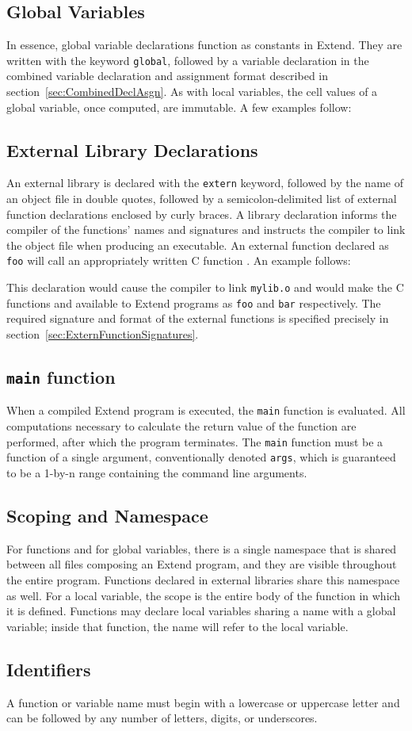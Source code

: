 	\subsection{Global Variables}
		In essence, global variable declarations function as constants in Extend. They are written with the keyword \texttt{global}, followed by a variable declaration in the combined variable declaration and assignment format described in section~\ref{sec:CombinedDeclAsgn}. As with local variables, the cell values of a global variable, once computed, are immutable. A few examples follow:
		
	\subsection{External Library Declarations}
	  An external library is declared with the \texttt{extern} keyword, followed by the name of an object file in double quotes, followed by a semicolon-delimited list of external function declarations enclosed by curly braces. A library declaration informs the compiler of the functions' names and signatures and instructs the compiler to link the
		object file when producing an executable. An external function declared as \texttt{foo} will call an appropriately written C function \texttt{}. An example follows:
		
		This declaration would cause the compiler to link \texttt{mylib.o} and would make the C functions \texttt{} and \texttt{} available to Extend programs as \texttt{foo} and \texttt{bar} respectively. The required signature and format of the external functions is specified precisely in section~\ref{sec:ExternFunctionSignatures}.
		\subsection{\texttt{main} function}
		When a compiled Extend program is executed, the \texttt{main} function is evaluated. All computations necessary to calculate the return value of the function are performed, after which the program terminates. The \texttt{main} function must be a function of a single argument, conventionally denoted \texttt{args}, which is guaranteed to be a 1-by-n range containing the command line arguments.
		\subsection{Scoping and Namespace}
		For functions and for global variables, there is a single namespace that is shared between all files composing an Extend program, and they are visible throughout the entire program. Functions declared in external libraries share this namespace as well. For a local variable, the scope is the entire body of the function in which it is defined. Functions may declare local variables sharing a name with a global variable; inside that function, the name will refer to the local variable.
		
		\subsection{Identifiers}
		A function or variable name must begin with a lowercase or uppercase letter and can be followed by any number of letters, digits, or underscores.
